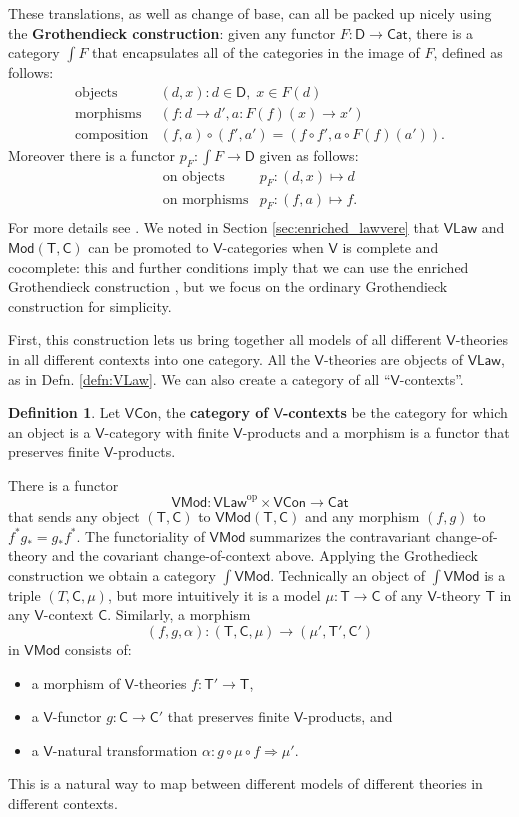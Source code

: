 \documentclass{amsart}
\theoremstyle{definition}
\newtheorem{definition}[theorem]{Definition}
\newcommand{\Cat}{\mathsf{Cat}}
\newcommand{\Law}{\mathsf{Law}}
\newcommand{\Mod}{\mathsf{Mod}}
\newcommand{\Con}{\mathsf{Con}}
\newcommand{\V}{\mathsf{V}}
\newcommand{\D}{\mathsf{D}}
\newcommand{\C}{\mathsf{C}}
\newcommand{\T}{\mathsf{T}}
\newcommand{\op}{\mathrm{op}}
\newcommand{\maps}{\colon}
\begin{document}
These translations, as well as change of base, can all be packed up nicely using the \textbf{Grothendieck construction}: given any functor $F\maps \D \to \Cat$, there is a category $\int F$ that encapsulates all of the categories in the image of $F$, defined
as follows:
\[\begin{array}{rl}
\text{objects} & (d,x) \colon d\in \D, \; x\in F(d)\\
\text{morphisms} & (f\maps d\to d',a\maps F(f)(x)\to x')\\
\text{composition} & (f,a) \circ (f',a') = (f \circ f', a \circ F(f)(a')).
\end{array}\]
Moreover there is a functor $p_F \maps \int F \to \D$ given as follows:
\[\begin{array}{rl}
\text{on objects} & p_F \maps (d,x) \mapsto d \\
\text{on morphisms} & p_F \maps (f,a) \mapsto f .\\
\end{array}\]
For more details see \cite{borceux,jacobs}. We noted in Section \ref{sec:enriched_lawvere} that $\V\Law$ and $\Mod(\T,\C)$ can be promoted to $\V$-categories when $\V$ is complete and cocomplete: this and further conditions imply that we can use the enriched Grothendieck construction \cite{beardsleywong}, but we focus on the ordinary Grothendieck
construction for simplicity.   

First, this construction lets us bring together all models of all different $\V$-theories in all different contexts into one category.   All the $\V$-theories
are objects of $\V\Law$, as in Defn. \ref{defn:VLaw}.   We can also create a category of all  ``$\V$-contexts''.

\begin{definition} 
\label{defn:VCon}
Let $\V\Con$, the \textbf{category of $\V$-contexts} be the category for which an
object is a $\V$-category with finite $\V$-products and  a morphism is a functor that
preserves finite $\V$-products.   
\end{definition}

There is a functor 
\[    \V\Mod\maps \V\Law^\op \times \V\Con \to \Cat \]
that sends any object $(\T,\C)$ to $\V\Mod(\T,\C)$ and any morphism $(f,g)$ to
$f^* g_* = g_* f^*$.   The functoriality of $\V\Mod$ summarizes the 
contravariant change-of-theory and the covariant change-of-context above.
Applying the Grothedieck construction we obtain a category $\int \V\Mod$. 
Technically an object of $\int \V\Mod$ is a triple $(T,\C,\mu)$, but more intuitively 
it is a model $\mu \maps \T \to \C$ of any $\V$-theory $\T$ in any $\V$-context $\C$.   Similarly, a morphism 
\[   (f,g,\alpha)\maps (\T,\C,\mu) \to (\mu',\T',\C') \]
in $\V\Mod$ consists of:
\begin{itemize}
\item
a morphism of $\V$-theories $f \maps \T' \to \T$,
\item
a $\V$-functor $g \maps\C\to \C'$ that preserves finite $\V$-products, and
\item 
a $\V$-natural transformation $\alpha\maps g \circ \mu \circ f \Rightarrow \mu'$.
\end{itemize}
This is a natural way to map between different models of different theories in different contexts.
\end{document}
